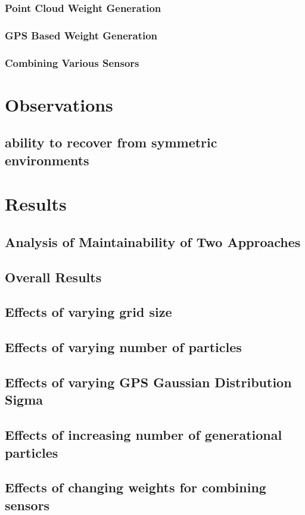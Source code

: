 \documentclass[10pt]{IEEEtran}
\begin{document}
\subsubsection{Point Cloud Weight Generation}
\subsubsection{GPS Based Weight Generation}
\subsubsection{Combining Various Sensors}


\section{Observations}
\subsection{ability to recover from symmetric environments}

\section{Results}
\subsection{Analysis of Maintainability of Two Approaches}
\subsection{Overall Results}
\subsection{Effects of varying grid size}
\subsection{Effects of varying number of particles}
\subsection{Effects of varying GPS Gaussian Distribution Sigma}
\subsection{Effects of increasing number of generational particles}
\subsection{Effects of changing weights for combining sensors}
\end{document}
